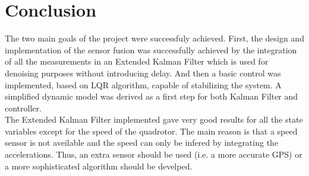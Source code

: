 \documentclass[conference]{IEEEtran}
\begin{document}
%





\section{Conclusion}

The two main goals of the project were successfuly achieved. First, the design and implementation of the sensor fusion was successfully achieved by the integration of all the measurements in an Extended Kalman Filter which is used for denoising purposes without introducing delay. And then a basic control was implemented, based on LQR algorithm, capable of stabilizing the system. A simplified dynamic model was derived as a first step for both Kalman Filter and controller. \\

The Extended Kalman Filter implemented gave very good results for all the state variables except for the speed of the quadrotor. The main reason is that a speed sensor is not aveilable and the speed can only be infered by integrating the accelerations. Thus, an extra sensor should be used (i.e. a more accurate GPS) or a more sophisticated algorithm should be develped. \\
\end{document}
